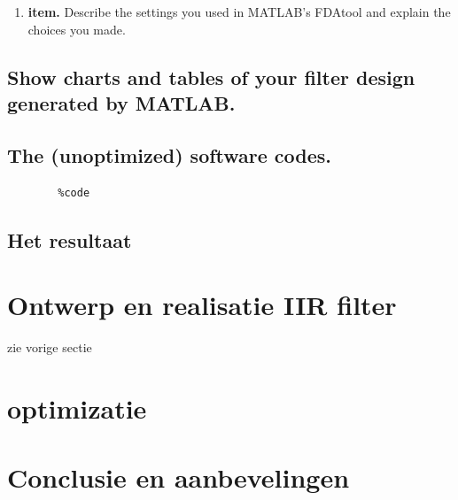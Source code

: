\documentclass[11pt,a4paper]{article}
\newcommand\litem[1]{\item{\bfseries#1.\space}}
\begin{document}
	\begin{enumerate}[label=\emph{\alph*)}]
		\litem{item} Describe the settings you 					used in MATLAB’s FDAtool and explain the 					choices you made.
	\end{enumerate}
	
	\subsection{Show charts and tables of your filter design generated by MATLAB.}
	
	\subsection{The (unoptimized) software codes.}

	\begin{lstlisting}
		%code
	\end{lstlisting}
	
	\subsection{Het resultaat}

	
	
	
	
	\section{Ontwerp en realisatie IIR filter}
	zie vorige sectie
	
	\section{optimizatie}
	

	\section{Conclusie en aanbevelingen}
	
\end{document}
